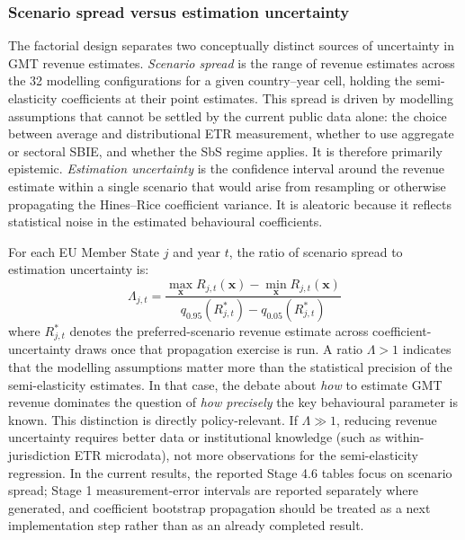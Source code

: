 \documentclass[11pt,a4paper]{article}
\begin{document}
\subsubsection{Scenario spread versus estimation uncertainty}\label{sec:two_uncertainties}

The factorial design separates two conceptually distinct sources of uncertainty in GMT revenue estimates. \emph{Scenario spread} is the range of revenue estimates across the 32 modelling configurations for a given country--year cell, holding the semi-elasticity coefficients at their point estimates. This spread is driven by modelling assumptions that cannot be settled by the current public data alone: the choice between average and distributional ETR measurement, whether to use aggregate or sectoral SBIE, and whether the SbS regime applies. It is therefore primarily epistemic. \emph{Estimation uncertainty} is the confidence interval around the revenue estimate within a single scenario that would arise from resampling or otherwise propagating the Hines--Rice coefficient variance. It is aleatoric because it reflects statistical noise in the estimated behavioural coefficients.

For each EU Member State $j$ and year $t$, the ratio of scenario spread to estimation uncertainty is:
\begin{equation}\label{eq:spread_ratio}
\Lambda_{j,t} = \frac{\max_{\mathbf{x}} R_{j,t}(\mathbf{x}) - \min_{\mathbf{x}} R_{j,t}(\mathbf{x})}{q_{0.95}(R_{j,t}^{*}) - q_{0.05}(R_{j,t}^{*})}
\end{equation}
where $R_{j,t}^{*}$ denotes the preferred-scenario revenue estimate across coefficient-uncertainty draws once that propagation exercise is run. A ratio $\Lambda > 1$ indicates that the modelling assumptions matter more than the statistical precision of the semi-elasticity estimates. In that case, the debate about \emph{how} to estimate GMT revenue dominates the question of \emph{how precisely} the key behavioural parameter is known. This distinction is directly policy-relevant. If $\Lambda \gg 1$, reducing revenue uncertainty requires better data or institutional knowledge (such as within-jurisdiction ETR microdata), not more observations for the semi-elasticity regression. In the current results, the reported Stage 4.6 tables focus on scenario spread; Stage 1 measurement-error intervals are reported separately where generated, and coefficient bootstrap propagation should be treated as a next implementation step rather than as an already completed result.
\end{document}
